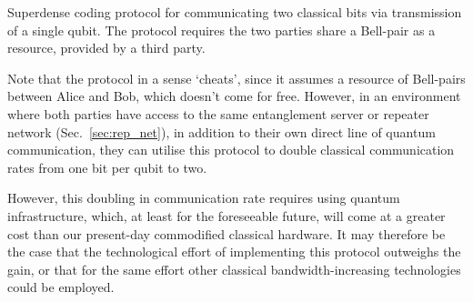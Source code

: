 \begin{table}[!htb]
\caption{Superdense coding protocol for communicating two classical bits via transmission of a single qubit. The protocol requires the two parties share a Bell-pair as a resource, provided by a third party.} \label{alg:superdense}
\end{table}

Note that the protocol in a sense `cheats', since it assumes a resource of Bell-pairs between Alice and Bob, which doesn't come for free. However, in an environment where both parties have access to the same entanglement server or repeater network (Sec.~\ref{sec:rep_net}), in addition to their own direct line of quantum communication, they can utilise this protocol to double classical communication rates from one bit per qubit to two.

However, this doubling in communication rate requires using quantum infrastructure, which, at least for the foreseeable future, will come at a greater cost than our present-day commodified classical hardware. It may therefore be the case that the technological effort of implementing this protocol outweighs the gain, or that for the same effort other classical bandwidth-increasing technologies could be employed.

